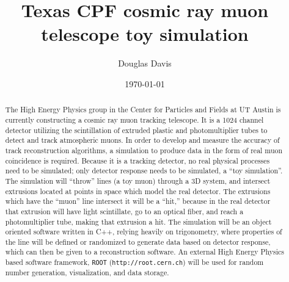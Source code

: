 \documentclass[aip,floatfix,twocolumn,nofootinbib]{revtex4-1}
\begin{document}
\title{Texas CPF cosmic ray muon telescope toy simulation}
\author{Douglas Davis}
\date{\today}
\begin{abstract}
The High Energy Physics group in the Center for Particles and Fields at UT Austin is currently constructing a cosmic ray muon tracking telescope. It is a 1024 channel detector utilizing the scintillation of extruded plastic and photomultiplier tubes to detect and track atmospheric muons. In order to develop and measure the accuracy of track reconstruction algorithms, a simulation to produce data in the form of real muon coincidence is required. Because it is a tracking detector, no real physical processes need to be simulated; only detector response needs to be simulated, a ``toy simulation''. The simulation will ``throw'' lines (a toy muon) through a 3D system, and intersect extrusions located at points in space which model the real detector. The extrusions which have the ``muon'' line intersect it will be a ``hit,'' because in the real detector that extrusion will have light scintillate, go to an optical fiber, and reach a photomultiplier tube, making that extrusion a hit. The simulation will be an object oriented software written in C++, relying heavily on trigonometry, where properties of the line will be defined or randomized to generate data based on detector response, which can then be given to a reconstruction software. An external High Energy Physics based software framework, \texttt{ROOT} (\texttt{http://root.cern.ch}) will be used for random number generation, visualization, and data storage.
\end{abstract}
\maketitle
\end{document}
